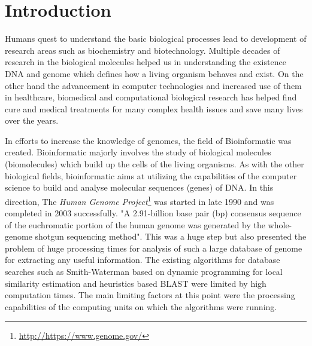 \documentclass[12pt,twoside]{article}
\begin{document}
\section{Introduction}
\label{sec:introduction}

Humans quest to understand the basic biological processes lead to development of research areas such as
biochemistry and biotechnology. Multiple decades of research in the biological molecules helped us in
understanding the existence DNA and genome which defines how a living organism behaves and exist.
On the other hand the advancement in computer technologies and increased use of them in healthcare, biomedical
and computational biological research has helped find cure and medical treatments for many complex health
issues and save many lives over the years.

In efforts to increase the knowledge of genomes, the field of Bioinformatic was created. Bioinformatic majorly involves
the study of biological molecules (biomolecules) which build up the cells of the living organisms. As with the other biological fields,
bioinformatic aims at utilizing the capabilities of the computer science to build and analyse molecular sequences (genes) of DNA.
In this direction, The \emph{Human Genome Project}\footnote{\url{http://https://www.genome.gov/}}  was started in late 1990 and was
completed in 2003 successfully. "A 2.91-billion base pair (bp) consensus sequence of the euchromatic portion of
the human genome was generated by the whole-genome shotgun sequencing method"\cite{venter_sequence_2001}. This was a huge
step but also presented the problem of huge processing times for analysis of such a large database of genome for extracting any
useful information. The existing algorithms for database searches such as Smith-Waterman \cite{smith_identification_1981} based
on dynamic programming for local similarity estimation and heuristics based BLAST \cite{altschul_basic_1990} were limited by
high computation times. The main limiting factors at this point were the processing capabilities of the computing units
on which the algorithms were running.
\end{document}
